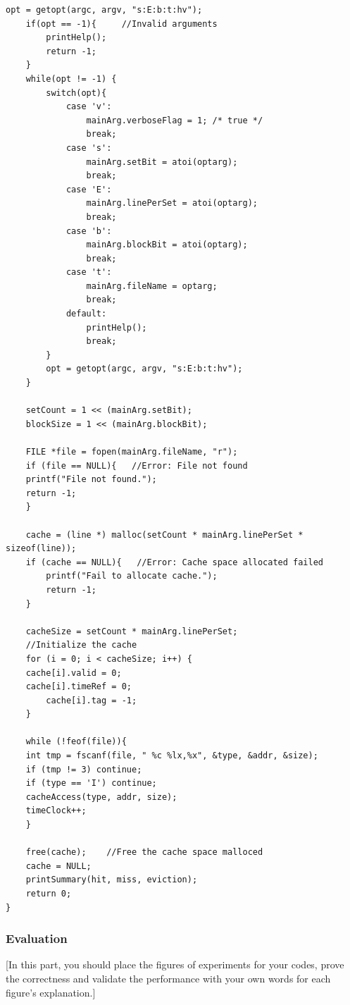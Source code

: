 \documentclass{article}
\begin{document}
\begin{lstlisting}[title=csim.c, frame=shadowbox]
    opt = getopt(argc, argv, "s:E:b:t:hv");
    if(opt == -1){     //Invalid arguments
        printHelp();
        return -1;
    }
    while(opt != -1) {
        switch(opt){
            case 'v':
                mainArg.verboseFlag = 1; /* true */
                break;          
            case 's':
                mainArg.setBit = atoi(optarg);
                break;               
            case 'E':
                mainArg.linePerSet = atoi(optarg);
                break;                 
            case 'b':
                mainArg.blockBit = atoi(optarg);
                break;            
            case 't':   
                mainArg.fileName = optarg;
                break;
            default:
                printHelp();
                break;
        }     
        opt = getopt(argc, argv, "s:E:b:t:hv");
    }

    setCount = 1 << (mainArg.setBit);
    blockSize = 1 << (mainArg.blockBit);

    FILE *file = fopen(mainArg.fileName, "r");
    if (file == NULL){   //Error: File not found
	printf("File not found.");
	return -1;
    }

    cache = (line *) malloc(setCount * mainArg.linePerSet * sizeof(line));
	if (cache == NULL){   //Error: Cache space allocated failed
	    printf("Fail to allocate cache.");
	    return -1;
	}

    cacheSize = setCount * mainArg.linePerSet;
    //Initialize the cache
    for (i = 0; i < cacheSize; i++) {
	cache[i].valid = 0;
	cache[i].timeRef = 0;
        cache[i].tag = -1;
    }

    while (!feof(file)){
	int tmp = fscanf(file, " %c %lx,%x", &type, &addr, &size);
	if (tmp != 3) continue;
	if (type == 'I') continue;
	cacheAccess(type, addr, size);
	timeClock++;
    }

    free(cache);    //Free the cache space malloced
    cache = NULL;
    printSummary(hit, miss, eviction);
    return 0;
}

\end{lstlisting}


\subsubsection{Evaluation}

[In this part, you should place the figures of experiments for your codes, prove the correctness and validate the performance with your own words for each figure’s explanation.]
\end{document}
